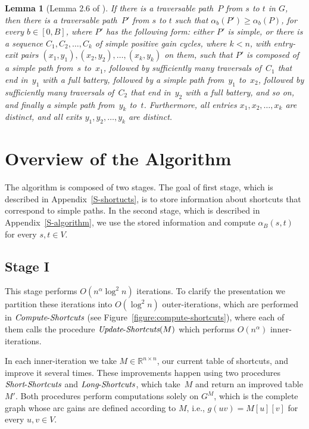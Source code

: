 \documentclass[11pt]{article}
\newtheorem{lemma}[theorem]{Lemma}
\newcommand{\RR}{\mathbb{R}}
\newcommand{\LS}{\mbox{{\it Long}-{\it Shortcuts}}}
\newcommand{\Simple}{\mbox{{\it Short}-{\it Shortcuts}}}
\newcommand{\ComputeS}{\mbox{{\it Compute}-{\it Shortcuts}}}
\newcommand{\UpdateS}{\mbox{{\it Update}-{\it Shortcuts}}}
\begin{document}
\begin{lemma}[Lemma 2.6 of \cite{DorfmanKTZ23}]\label{lemma:optimal-structure}
 If there is a traversable path~$P$ from $s$ to $t$ in $G$, then there is a traversable path~$P'$ from $s$ to $t$ such that $\alpha_b(P')\ge \alpha_b(P)$, for every $b \in [0,B]$, where $P'$ has the following form: either $P'$ is simple, or there is a sequence $C_1,C_2,\ldots,C_k$ of simple positive gain cycles, where $k<n$, with entry-exit pairs $(x_1,y_1),(x_2,y_2),\ldots,(x_k,y_k)$ on them, such that $P'$ is composed of a simple path from~$s$ to~$x_1$, followed by sufficiently many traversals of~$C_1$ that end in~$y_1$ with a full battery, followed by a simple path from~$y_1$ to~$x_2$, followed by sufficiently many traversals of~$C_2$ that end in~$y_2$ with a full battery, and so on, and finally a simple path from~$y_k$ to~$t$. Furthermore, all entries $x_1,x_2,\ldots,x_k$ are distinct, and all exits $y_1,y_2,\ldots,y_k$ are distinct.
\end{lemma}




\section{Overview of the Algorithm}\label{S-overview}
The algorithm is composed of two stages. The goal of first stage, which is described in Appendix~\ref{S-shortucts}, is to store information about shortcuts that correspond to simple paths. In the second stage, which is described in Appendix~\ref{S-algorithm}, we use the stored information and compute $\alpha_B(s,t)$ for every $s,t\in V$.


\subsection{Stage I}
This stage performs $O\left(n^\alpha\log^2 n\right)$ iterations.
To clarify the presentation we partition these iterations into 
$O\left(\log^2 n\right)$ outer-iterations, which are performed in $\ComputeS$ (see Figure~\ref{figure:compute-shortcuts}), where each of them calls the procedure $\UpdateS(M)$ which performs 
$O(n^\alpha)$
inner-iterations.

In each inner-iteration we take $M\in \RR^{n\times n}$, our current table of shortcuts, and improve it several times. These improvements happen using two procedures $\Simple$ and $\LS$, which take~$M$ and return an improved table $M'$. Both procedures perform computations solely on $G^M$, which is the complete graph whose arc gains are defined according to $M$, i.e., $g(uv)=M[u][v]$ for every $u,v\in V$.
\end{document}
